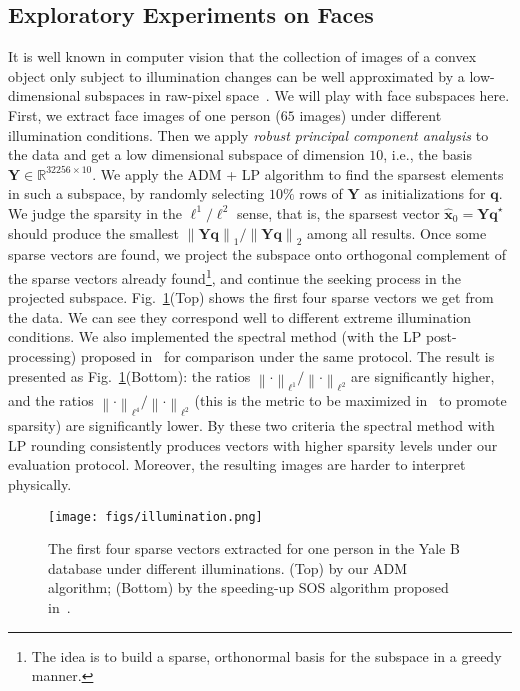 \documentclass[11pt, journal, final]{IEEEtran}
\numberwithin{equation}{section}
\newcommand{\R}{\mathbb{R}}
\newcommand{\mb}{\mathbf}
\newcommand{\norm}[1]{\left\lVert#1\right\rVert}
\begin{document}
{\subsection{Exploratory Experiments on Faces} \label{sec:face_exp}
It is well known in computer vision that the collection of images of a convex object only subject to illumination changes can be well approximated by a low-dimensional subspaces in raw-pixel space~\cite{basri2003lambertian}. We will play with face subspaces here. First, we extract face images of one person ($65$ images) under different illumination conditions. Then we apply \emph{robust principal component analysis} \cite{Candes2011-JACM} to the data and get a low dimensional subspace of dimension $10$, i.e., the basis $\mb Y \in \R^{32256\times 10}$. We apply the ADM + LP algorithm to find the sparsest elements in such a subspace, by randomly selecting $10\%$ rows of $\mb Y$ as initializations for ${\mb q}$. We judge the sparsity in the $\ell^1/\ell^2$ sense, that is, the sparsest vector $\widehat{\mb x}_0={\mb Y\mb q}^\star$ should produce the smallest $\norm{\mb Y \mb q}_1/\norm{\mb Y \mb q}_2$ among all results. Once some sparse vectors are found, we project the subspace onto orthogonal complement of the sparse vectors already found\footnote{The idea is to build a sparse, orthonormal basis for the subspace in a greedy manner. }, and continue the seeking process in the projected subspace. Fig.~\ref{face_exp_1}(Top) shows the first four sparse vectors we get from the data. We can see they correspond well to different extreme illumination conditions. We also implemented the spectral method (with the LP post-processing) proposed in~\cite{hopkins2015speeding} for comparison under the same protocol. The result is presented as Fig.~\ref{face_exp_1}(Bottom): the ratios $\norm{\cdot}_{\ell^1}/\norm{\cdot}_{\ell^2}$ are significantly higher, and the ratios $\norm{\cdot}_{\ell^4}/\norm{\cdot}_{\ell^2}$ (this is the metric to be maximized in~\cite{hopkins2015speeding} to promote sparsity) are significantly lower. By these two criteria the spectral method with LP rounding consistently produces vectors with higher sparsity levels under our evaluation protocol. Moreover, the resulting images are harder to interpret physically.

\begin{figure}[!htbp]
\begin{center}
\texttt{[image: figs/illumination.png]}\\
\end{center}
\caption{The first four sparse vectors extracted for one person in the Yale B database under different illuminations. (Top) by our ADM algorithm; (Bottom) by the speeding-up SOS algorithm proposed in~\cite{hopkins2015speeding}. }
\label{face_exp_1}
\end{figure}

}
\end{document}
